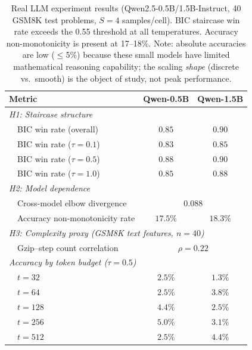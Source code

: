 \begin{table}[t]
\centering
\caption{Real LLM experiment results (Qwen2.5-0.5B/1.5B-Instruct, 40 GSM8K test problems, $S{=}4$ samples/cell). BIC staircase win rate exceeds the 0.55 threshold at all temperatures.  Accuracy non-monotonicity is present at 17--18\%.  Note: absolute accuracies are low ($\leq$5\%) because these small models have limited mathematical reasoning capability; the scaling \emph{shape} (discrete vs.\ smooth) is the object of study, not peak performance.}
\label{tab:real}
\small
\begin{tabular}{lcc}
\toprule
\textbf{Metric} & \textbf{Qwen-0.5B} & \textbf{Qwen-1.5B} \\
\midrule
\multicolumn{3}{l}{\textit{H1: Staircase structure}} \\
\ \ BIC win rate (overall) & $0.85$ & $\bm{0.90}$ \\
\ \ BIC win rate ($\tau{=}0.1$) & $0.83$ & $0.85$ \\
\ \ BIC win rate ($\tau{=}0.5$) & $0.88$ & $\bm{0.90}$ \\
\ \ BIC win rate ($\tau{=}1.0$) & $0.85$ & $0.88$ \\
\midrule
\multicolumn{3}{l}{\textit{H2: Model dependence}} \\
\ \ Cross-model elbow divergence & \multicolumn{2}{c}{$0.088$} \\
\ \ Accuracy non-monotonicity rate & $17.5\%$ & $18.3\%$ \\
\midrule
\multicolumn{3}{l}{\textit{H3: Complexity proxy (GSM8K text features, $n{=}40$)}} \\
\ \ Gzip--step count correlation & \multicolumn{2}{c}{$\rho = 0.22$} \\
\midrule
\multicolumn{3}{l}{\textit{Accuracy by token budget ($\tau{=}0.5$)}} \\
\ \ $t = 32$ & $2.5\%$ & $1.3\%$ \\
\ \ $t = 64$ & $2.5\%$ & $3.8\%$ \\
\ \ $t = 128$ & $4.4\%$ & $2.5\%$ \\
\ \ $t = 256$ & $5.0\%$ & $3.1\%$ \\
\ \ $t = 512$ & $2.5\%$ & $4.4\%$ \\
\bottomrule
\end{tabular}
\end{table}
